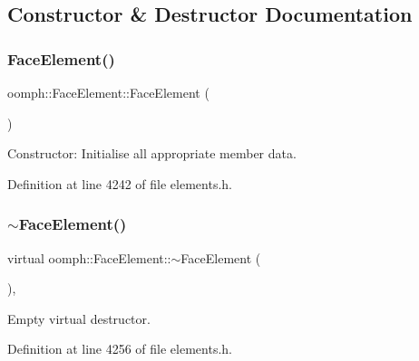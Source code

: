 \subsection{Constructor \& Destructor Documentation}
\mbox{\label{classoomph_1_1FaceElement_a63f236503b58841500498b98d4fb9721}} 
\subsubsection{\texorpdfstring{Face\+Element()}{FaceElement()}\hspace{0.1cm}{\footnotesize\ttfamily [1/2]}}
{\footnotesize\ttfamily oomph\+::\+Face\+Element\+::\+Face\+Element (\begin{DoxyParamCaption}{ }\end{DoxyParamCaption})\hspace{0.3cm}{\ttfamily [inline]}}



Constructor\+: Initialise all appropriate member data. 



Definition at line 4242 of file elements.\+h.

\mbox{\label{classoomph_1_1FaceElement_af1eb8c85722a8bdb196f94758dc3c630}} 
\subsubsection{\texorpdfstring{$\sim$\+Face\+Element()}{~FaceElement()}}
{\footnotesize\ttfamily virtual oomph\+::\+Face\+Element\+::$\sim$\+Face\+Element (\begin{DoxyParamCaption}{ }\end{DoxyParamCaption})\hspace{0.3cm}{\ttfamily [inline]}, {\ttfamily [virtual]}}



Empty virtual destructor. 



Definition at line 4256 of file elements.\+h.

